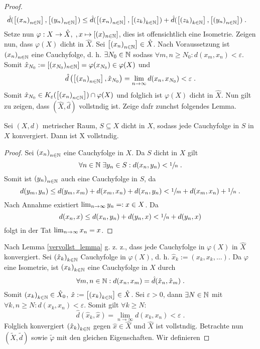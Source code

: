 \begin{proof}
\begin{align*}
		 \hat d(\left[ \left (x_n\right )_{n\in \mathbb{N}}\right],\left[ \left (y_n\right )_{n\in \mathbb{N}}\right]) &\leq \hat d(\left[ \left (x_n\right )_{n\in \mathbb{N}}\right], \left[ \left (z_k\right )_{k\in \mathbb{N}}\right]) + \hat d(\left[ \left (z_k\right )_{k\in \mathbb{N}}\right], \left[ \left (y_n\right )_{n\in \mathbb{N}}\right]) \;.
	\end{align*}
	Setze nun
	\(\varphi: X \to \hat X, \;, x \mapsto \left[ (x)_{n\in\mathbb{N}}\right]\), dies ist offensichtlich eine Isometrie. Zeigen nun, dass $\varphi(X)$ dicht in $\hat X$. Sei $\left[ \left (x_n\right )_{n\in \mathbb{N}}\right] \in \hat X$. Nach Voraussetzung ist $\left (x_n\right )_{n\in \mathbb{N}}$ eine Cauchyfolge, d. h. $\exists N_0 \in \mathbb{N}$ sodass \(\forall m,n \geq  N_0: d(x_m, x_n) < \varepsilon \). Somit \(\hat x_{N_0} := \left[ (x_{N_0})_{n \in \mathbb{N}}\right] = \varphi(x_{N_0}) \in \varphi(X)\) und
	\[\hat d\left (\left[ \left (x_n\right )_{n\in \mathbb{N}}\right], \hat x_{N_0} \right) = \lim_{n\to\infty} d(x_n, x_{N_0})< \varepsilon\; .\]
	Somit \(\hat x_{N_0} \in K_\varepsilon (\left[ \left (x_n\right )_{n\in \mathbb{N}}\right]) \cap \varphi(X)\) und folglich ist \(\varphi(X)\) dicht in $\hat X$.  Nun gilt zu zeigen, dass $(\hat X, \hat d)$ vollst\as ndig ist. Zeige daf\us r zun\as chst folgendes Lemma.
	\begin{lemma}
		Sei \((X,d)\) metrischer Raum, $S\subseteq X$ dicht in $X$, sodass jede Cauchyfolge in $S$ in $X$ konvergiert. Dann ist X vollst\as ndig.\label{vervollst_lemma}
	\end{lemma}
	\begin{proof}
		Sei $\left (x_n\right )_{n\in \mathbb{N}}$ eine Cauchyfolge in $X$. Da $S$ dicht in $X$ gilt
		\[\forall n \in \mathbb{N} \;\exists y_n \in S: d(x_n, y_n) < \sfrac 1n \;.\]
		Somit ist \(\left (y_n\right )_{n\in \mathbb{N}}\) auch eine Cauchyfolge in $S$, da
		\[d(y_m, y_n) \leq d(y_m, x_m) + d(x_m, x_n) + d(x_n, y_n) < \sfrac 1m + d(x_m, x_n) + \sfrac 1n \;.\]
		Nach Annahme existiert $\lim_{n \to \infty} y_n =: x \in X$. Da
		\[d(x_n, x) \leq d(x_n, y_n) + d(y_n, x) < \sfrac 1n + d(y_n, x)\]
		folgt in der Tat \(\lim_{n \to \infty} x_n = x\).
	\end{proof}
	Nach Lemma \ref{vervollst_lemma} g. z. z., dass jede Cauchyfolge in \(\varphi(X) \) in $\hat X$ konvergiert. Sei $\left (\hat x_k\right )_{k\in \mathbb{N}}$ Cauchyfolge in $\varphi(X)$, d. h. \(\hat x_k := (x_k, x_k,\ldots)\). Da $\varphi$ eine Isometrie, ist $\left (x_k\right )_{k\in \mathbb{N}}$ eine Cauchyfolge in $X$ durch 
	\[\forall m, n \in \mathbb{N}: d(x_n, x_m) = \hat d(\hat x_n, \hat x_m) \;.\]
	Somit \(\left (x_k\right )_{k\in \mathbb{N}} \in \hat X_0\), \(\hat x :=\left[ \left (x_k\right )_{k\in \mathbb{N}}\right] \in \hat X\). Sei $\varepsilon >0$, dann $\exists N \in \mathbb{N}$ mit \(\forall k, n \geq N: d(x_k, x_n) < \varepsilon\). Somit gilt \(\forall k \geq N\):
	\[\hat d(\hat x_k, \hat x) = \lim_{n\to\infty} d(x_k, x_n) < \varepsilon \;.\]
	Folglich konvergiert $\left (\hat x_k\right )_{k\in \mathbb{N}}$ gegen $\hat x \in \hat X$ und $\hat X$ ist vollst\as ndig.
	Betrachte nun \((\tilde X, \tilde d)\) sowie \(\tilde \varphi\) mit den gleichen Eigenschaften. Wir definieren 

\end{proof}
